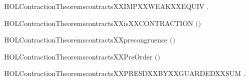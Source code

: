 \newcommand{\HOLContractionTheoremscontractsXXEPSYY}{\UseVerbatim{HOLContractionTheoremscontractsXXEPSYY}}
\begin{SaveVerbatim}{HOLContractionTheoremscontractsXXIMPXXWEAKXXEQUIV}
\HOLTokenTurnstile{} \HOLSymConst{\HOLTokenForall{}} .    \HOLSymConst{\HOLTokenImp{}}   
\end{SaveVerbatim}
\newcommand{\HOLContractionTheoremscontractsXXIMPXXWEAKXXEQUIV}{\UseVerbatim{HOLContractionTheoremscontractsXXIMPXXWEAKXXEQUIV}}
\begin{SaveVerbatim}{HOLContractionTheoremscontractsXXisXXCONTRACTION}
\HOLTokenTurnstile{}  \ensuremath{(}\ensuremath{)}
\end{SaveVerbatim}
\newcommand{\HOLContractionTheoremscontractsXXisXXCONTRACTION}{\UseVerbatim{HOLContractionTheoremscontractsXXisXXCONTRACTION}}
\begin{SaveVerbatim}{HOLContractionTheoremscontractsXXprecongruence}
\HOLTokenTurnstile{}  \ensuremath{(}\ensuremath{)}
\end{SaveVerbatim}
\newcommand{\HOLContractionTheoremscontractsXXprecongruence}{\UseVerbatim{HOLContractionTheoremscontractsXXprecongruence}}
\begin{SaveVerbatim}{HOLContractionTheoremscontractsXXPreOrder}
\HOLTokenTurnstile{}  \ensuremath{(}\ensuremath{)}
\end{SaveVerbatim}
\newcommand{\HOLContractionTheoremscontractsXXPreOrder}{\UseVerbatim{HOLContractionTheoremscontractsXXPreOrder}}
\begin{SaveVerbatim}{HOLContractionTheoremscontractsXXPRESDXXBYXXGUARDEDXXSUM}
\HOLTokenTurnstile{} \HOLSymConst{\HOLTokenForall{}}     .
          \HOLSymConst{\HOLTokenConj{}}    \HOLSymConst{\HOLTokenImp{}}
       \HOLSymConst{\ensuremath{\ldotp}} \HOLSymConst{\ensuremath{+}} \HOLSymConst{\ensuremath{\ldotp}}  \HOLSymConst{\ensuremath{\ldotp}} \HOLSymConst{\ensuremath{+}} \HOLSymConst{\ensuremath{\ldotp}}
\end{SaveVerbatim}
